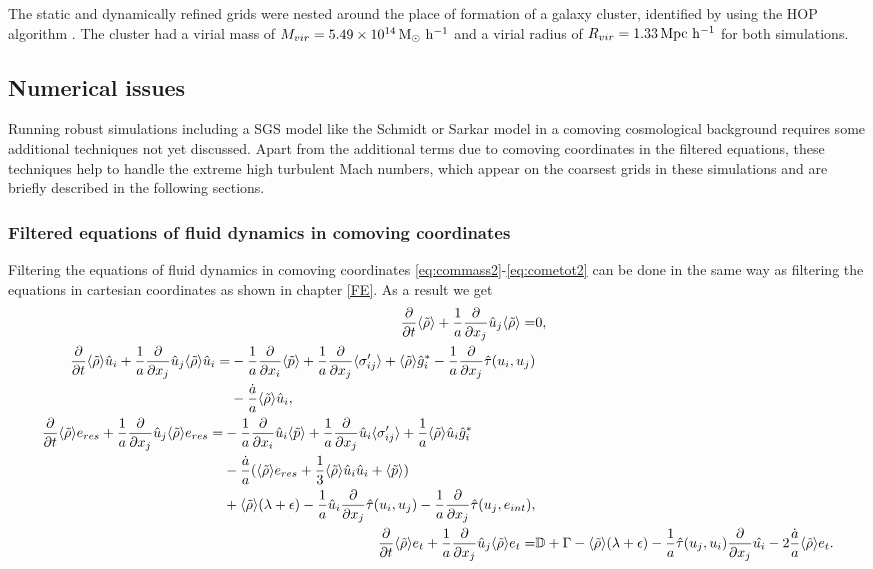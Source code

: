 The static and dynamically refined grids were nested around the place of
formation of a galaxy cluster, identified by \citet{Iapichino2008} using the
HOP algorithm \citep{Eisenstein1998}. The cluster had a virial mass of
$M_{vir}=\unit[5.49 \times 10^{14}]{M_{\odot}\ h^{-1}}$ and a virial radius of
$R_{vir}=\unit[1.33]{Mpc\ h^{-1}}$ for both simulations.  

\subsection{Numerical issues}\label{numissues}
Running robust simulations including a SGS model like the Schmidt or Sarkar
model in a comoving cosmological background requires some additional techniques
not yet discussed. Apart from the additional terms due 
to comoving coordinates in the filtered equations, these techniques help to
handle the extreme high turbulent Mach numbers, which appear on the coarsest
grids in these simulations and are briefly described in the following sections.

\subsubsection{Filtered equations of fluid dynamics in comoving coordinates}
Filtering the equations of fluid dynamics in comoving coordinates
\eqref{eq:commass2}-\eqref{eq:cometot2} can be done in the same way as
filtering the equations in cartesian coordinates as shown in chapter \ref{FE}.
As a result we get
\begin{align}
\frac{\partial}{\partial t}\langle \tilde{\rho} \rangle + \frac{1}{a}\frac{\partial}{\partial x_j}\hat{u}_j \langle \tilde{\rho} \rangle =& 0,
\label{eq:filcommass2}\\
\begin{split}
\frac{\partial}{\partial t}\langle \tilde{\rho} \rangle \hat{u}_i 
+ \frac{1}{a}\frac{\partial}{\partial x_j}\hat{u}_j \langle \tilde{\rho} \rangle \hat{u}_i =& 
-\frac{1}{a}\frac{\partial}{\partial x_i}\langle \tilde{p} \rangle+ \frac{1}{a}\frac{\partial}{\partial x_j}\langle \sigma'_{ij} \rangle 
+\langle \tilde{\rho} \rangle\hat{g}^*_i 
-\frac{1}{a}\frac{\partial}{\partial x_j}\hat{\tau}(u_i,u_j)\\
&- \frac{\dot{a}}{a} \langle \tilde{\rho} \rangle \hat{u}_i,
\label{eq:filcommom2}
\end{split}
\\
\begin{split}
\frac{\partial}{\partial t}\langle \tilde{\rho} \rangle e_{res}+\frac{1}{a}\frac{\partial}{\partial x_j}\hat{u}_j\langle \tilde{\rho} \rangle e_{res}=&
-\frac{1}{a}\frac{\partial}{\partial x_i}\hat{u}_i\langle \tilde{p} \rangle
+\frac{1}{a}\frac{\partial}{\partial x_j}\hat{u}_i\langle \sigma'_{ij} \rangle
+\frac{1}{a}\langle \tilde{\rho} \rangle\hat{u}_i\hat{g}^*_i\\
&-\frac{\dot{a}}{a}(\langle \tilde{\rho} \rangle e_{res}
+\frac{1}{3}\langle \tilde{\rho} \rangle\hat{u}_i\hat{u}_i+\langle \tilde{p} \rangle)\\
&+\langle \tilde{\rho} \rangle(\lambda+\epsilon)
-\frac{1}{a}\hat{u}_i\frac{\partial}{\partial x_j}\hat{\tau}(u_i,u_j)
-\frac{1}{a}\frac{\partial}{\partial x_j}\hat{\tau}(u_j,e_{int}),\label{eq:filcomresetot}
\end{split}
\\
\frac{\partial}{\partial t}\langle \tilde{\rho} \rangle e_t+\frac{1}{a}\frac{\partial}{\partial x_j}\hat{u}_j\langle \tilde{\rho} \rangle e_t=&
\mathbb{D} +\Gamma
-\langle \tilde{\rho} \rangle(\lambda+\epsilon)
-\frac{1}{a}\hat{\tau}(u_j,u_i)\frac{\partial}{\partial x_j}\hat{u_i}
-2\frac{\dot{a}}{a}\langle \tilde{\rho} \rangle e_t.
\label{eq:filcomet}
\end{align}

